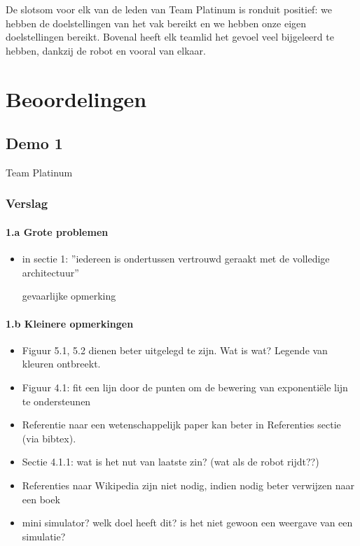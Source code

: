 \documentclass[12pt,a4paper]{report}
\begin{document}
De slotsom voor elk van de leden van Team Platinum is ronduit positief: we hebben de doelstellingen van het vak bereikt en we hebben onze eigen doelstellingen bereikt. Bovenal heeft elk teamlid het gevoel veel bijgeleerd te hebben, dankzij de robot en vooral van elkaar.

\appendix

\chapter{Beoordelingen}

\section{Demo 1}
\begin{center}
Team Platinum
\end{center}

\subsection{ Verslag} 
     
     \subsubsection{1.a Grote problemen}

\begin{itemize}
	\item   in sectie 1: 
	''iedereen is ondertussen vertrouwd geraakt met de volledige architectuur''

 gevaarlijke opmerking 
\end{itemize}

   \subsubsection{1.b Kleinere opmerkingen}

 
\begin{itemize}
 \item Figuur 5.1, 5.2 dienen beter uitgelegd te zijn. Wat is wat? Legende van kleuren ontbreekt. 
 \item Figuur 4.1: fit een lijn door de punten om de bewering van exponenti\"ele lijn te ondersteunen 
 \item Referentie naar een wetenschappelijk paper kan beter in Referenties sectie (via bibtex).
 \item Sectie 4.1.1: wat is het nut van laatste zin? (wat als de robot rijdt??)
 \item Referenties naar Wikipedia zijn niet nodig, indien nodig beter verwijzen naar een boek
 \item mini simulator? welk doel heeft dit? is het niet gewoon een weergave van een simulatie?
\end{itemize}
\end{document}
